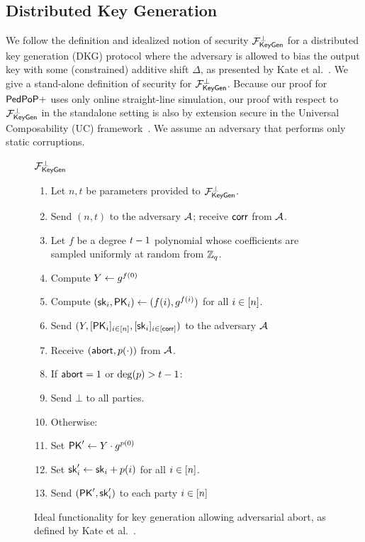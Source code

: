 \subsection{Distributed Key Generation}
\label{def:dgk}

We follow the definition and idealized notion of security $\mathcal{F}_{\mathsf{KeyGen}}^\bot$
for a distributed key generation (DKG) protocol where the adversary is allowed to bias the output key with some (constrained) additive  shift $\Delta$,
as presented by Kate et al.~\cite{KMSSSY26}.
We give a stand-alone definition of security for $\mathcal{F}_{\mathsf{KeyGen}}^\bot$.
Because our proof for $\mathsf{PedPoP+}$ uses only online straight-line simulation,
our proof with respect to $\mathcal{F}_{\mathsf{KeyGen}}^\bot$ in the standalone setting is also by extension secure in the Universal Composability (UC) framework~\cite{KushilevitzLR10}.
We assume an adversary that performs only static corruptions.


\begin{figure}[H]
  \begin{framed}
    \begin{center}
      $\mathcal{F}_{\mathsf{KeyGen}}^\bot$
      \begin{enumerate}
        \item Let $n, t$ be parameters provided to $\mathcal{F}_{\mathsf{KeyGen}}^\bot$.
        \item Send $(n, t)$ to the adversary $\mathcal{A}$; receive $\mathsf{corr}$ from $\mathcal{A}$.
        \item Let $f$ be a degree $t-1$ polynomial whose coefficients are sampled uniformly at random from $\mathbb{Z}_q$.
        \item Compute $Y \gets g^{f(0)}$
        \item Compute $(\mathsf{sk}_i,\mathsf{PK}_i) \gets (f(i), g^{f(i)})$ for all $i \in [n]$.
        \item Send $(Y, [\mathsf{PK}_i]_{i\in[n]}, [\mathsf{sk}_i]_{i\in[\mathsf{corr}]})$ to the adversary $\mathcal{A}$
        \item Receive $(\mathsf{abort}, p(\cdot))$ from $\mathcal{A}$.
        \item If $\mathsf{abort} = 1$ or $\deg(p) > t-1$:
        \item \qquad  Send $\bot$ to all parties.
        \item Otherwise:
        \item \qquad Set $\mathsf{PK}' \gets Y \cdot g^{p(0)}$
        \item \qquad Set $\mathsf{sk}_i' \gets \mathsf{sk}_i + p(i)$ for all $i \in [n]$.
        \item Send $(\mathsf{PK}', \mathsf{sk}_i')$ to each party $i \in [n]$
      \end{enumerate}
    \end{center}
  \end{framed}
    \caption{Ideal functionality for key generation allowing adversarial abort,
    as defined by Kate et al.~\cite{KMSSSY26}.
    }
  \label{fg:keygen-abort}
\end{figure}

